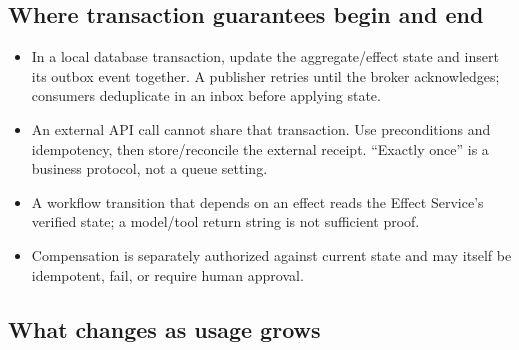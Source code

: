 \subsection{Where transaction guarantees begin and end}

\begin{itemize}

\item In a local database transaction, update the aggregate/effect state and insert its outbox event together. A publisher retries until the broker acknowledges; consumers deduplicate in an inbox before applying state.

\item An external API call cannot share that transaction. Use preconditions and idempotency, then store/reconcile the external receipt. “Exactly once” is a business protocol, not a queue setting.

\item A workflow transition that depends on an effect reads the Effect Service’s verified state; a model/tool return string is not sufficient proof.

\item Compensation is separately authorized against current state and may itself be idempotent, fail, or require human approval.

\end{itemize}

\subsection{What changes as usage grows}

